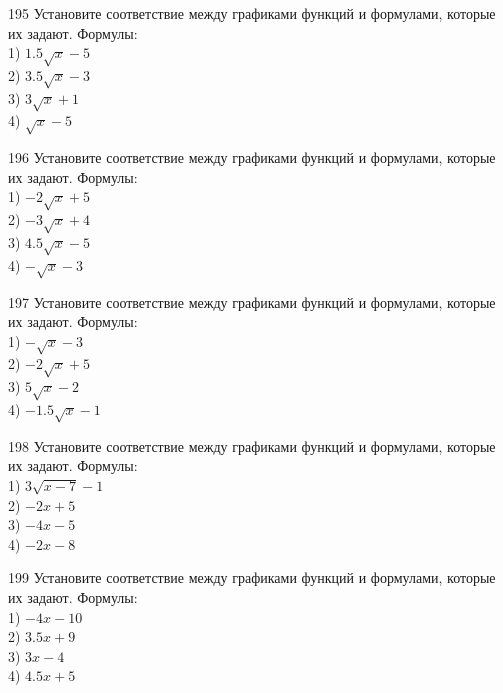 \documentclass[4apaper]{article}
\begin{document}
\begin{taskBN}{195}
Установите соответствие между графиками функций и формулами, которые их задают. Формулы: \\1) $1.5\sqrt{x}-5$\\2) $3.5\sqrt{x}-3$\\3) $3\sqrt{x}+1$\\4) $\sqrt{x}-5$
\end{taskBN}

\begin{taskBN}{196}
Установите соответствие между графиками функций и формулами, которые их задают. Формулы: \\1) $-2\sqrt{x}+5$\\2) $-3\sqrt{x}+4$\\3) $4.5\sqrt{x}-5$\\4) $-\sqrt{x}-3$
\end{taskBN}

\begin{taskBN}{197}
Установите соответствие между графиками функций и формулами, которые их задают. Формулы: \\1) $-\sqrt{x}-3$\\2) $-2\sqrt{x}+5$\\3) $5\sqrt{x}-2$\\4) $-1.5\sqrt{x}-1$
\end{taskBN}

\begin{taskBN}{198}
Установите соответствие между графиками функций и формулами, которые их задают. Формулы: \\1) $3\sqrt{x-7}-1$\\2) $-2x+5$\\3) $-4x-5$\\4) $-2x-8$
\end{taskBN}

\begin{taskBN}{199}
Установите соответствие между графиками функций и формулами, которые их задают. Формулы: \\1) $-4x-10$\\2) $3.5x+9$\\3) $3x-4$\\4) $4.5x+5$
\end{taskBN}
\end{document}
